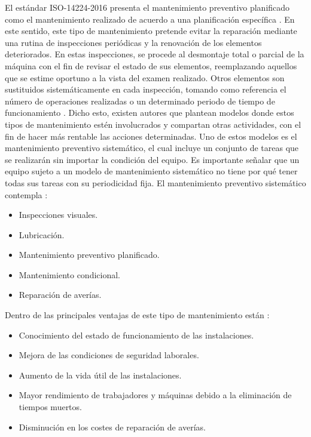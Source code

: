 El estándar ISO-14224-2016 presenta el mantenimiento preventivo planificado como el mantenimiento realizado de acuerdo a una planificación específica \citep{iso2016}. En este sentido, este tipo de mantenimiento pretende evitar la reparación mediante una rutina de inspecciones periódicas y la renovación de los elementos deteriorados. En estas inspecciones, se procede al desmontaje total o parcial de la máquina con el fin de revisar el estado de sus elementos, reemplazando aquellos que se estime oportuno a la vista del examen realizado. Otros elementos son sustituidos sistemáticamente en cada inspección, tomando como referencia el número de operaciones realizadas o un determinado periodo de tiempo de funcionamiento \citep{gomez1998}. Dicho esto, existen autores que plantean modelos donde estos tipos de mantenimiento estén involucrados y compartan otras actividades, con el fin de hacer más rentable las acciones determinadas. Uno de estos modelos es el mantenimiento preventivo sistemático, el cual incluye un conjunto de tareas que se realizarán sin importar la condición del equipo. Es importante señalar que un equipo sujeto a un modelo de mantenimiento sistemático no tiene por qué tener todas sus tareas con su periodicidad fija. El mantenimiento preventivo sistemático contempla \citep{garcia2010}:

\begin{itemize}
\item Inspecciones visuales.
\item Lubricación.
\item Mantenimiento preventivo planificado.
\item Mantenimiento condicional.
\item Reparación de averías.
\end{itemize}

Dentro de las principales ventajas de este tipo de mantenimiento están \citep{jimenez2015}:

\begin{itemize}
\item Conocimiento del estado de funcionamiento de las instalaciones.
\item Mejora de las condiciones de seguridad laborales.
\item Aumento de la vida útil de las instalaciones.
\item Mayor rendimiento de trabajadores y máquinas debido a la eliminación de tiempos muertos.
\item Disminución en los costes de reparación de averías.
\end{itemize}

